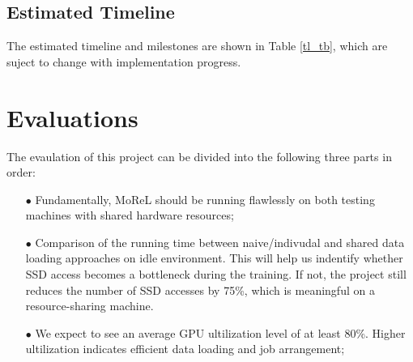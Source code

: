 \documentclass[conference]{IEEEtran}
\begin{document}
\subsection{Estimated Timeline} \label{sebsec_esttl}

The estimated timeline and milestones are shown in Table \ref{tl_tb}, which are suject to change with implementation progress. 

\begin{table}[!htb]
	\centering
	\caption{\small 
		Estimated timeline. }
	\label{tl_tb}
\end{table}

\section{Evaluations} \label{sec_eval}

The evaulation of this project can be divided into the following three parts in order:
\begin{itemize}
	\item[$\bullet$]  Fundamentally, MoReL should be running flawlessly on both testing machines with shared hardware resources;
	\item[$\bullet$]  Comparison of the running time between naive/indivudal and shared data loading approaches on idle environment. 
		This will help us indentify whether SSD access becomes a bottleneck during the training. 
		If not, the project still reduces the number of SSD accesses by 75\%, which is meaningful on a resource-sharing machine. 
	\item[$\bullet$]  We expect to see an average GPU ultilization level of at least 80\%. 
		Higher ultilization indicates efficient data loading and job arrangement;
\end{itemize}
\end{document}
